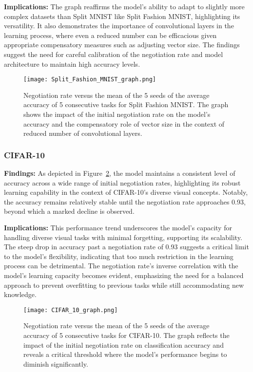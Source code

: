 \documentclass{article}
\begin{document}
\textbf{Implications:} The graph reaffirms the model’s ability to adapt to slightly more complex datasets than Split MNIST like Split Fashion MNIST, highlighting its versatility. It also demonstrates the importance of convolutional layers in the learning process, where even a reduced number can be efficacious given appropriate compensatory measures such as adjusting vector size. The findings suggest the need for careful calibration of the negotiation rate and model architecture to maintain high accuracy levels.

\begin{figure}[htbp]
\centering
\texttt{[image: Split\_Fashion\_MNIST\_graph.png]}
\caption{Negotiation rate versus the mean of the 5 seeds of the average accuracy of 5 consecutive tasks for Split Fashion MNIST. The graph shows the impact of the initial negotiation rate on the model's accuracy and the compensatory role of vector size in the context of reduced number of convolutional layers.}
\label{fig:Split_Fashion_MNIST_graph}
\end{figure}


\subsubsection{CIFAR-10}
\textbf{Findings:} As depicted in Figure~\ref{fig:CIFAR_10_graph}, the model maintains a consistent level of accuracy across a wide range of initial negotiation rates, highlighting its robust learning capability in the context of CIFAR-10's diverse visual concepts. Notably, the accuracy remains relatively stable until the negotiation rate approaches 0.93, beyond which a marked decline is observed.

\textbf{Implications:} This performance trend underscores the model's capacity for handling diverse visual tasks with minimal forgetting, supporting its scalability. The steep drop in accuracy past a negotiation rate of 0.93 suggests a critical limit to the model's flexibility, indicating that too much restriction in the learning process can be detrimental. The negotiation rate's inverse correlation with the model's learning capacity becomes evident, emphasizing the need for a balanced approach to prevent overfitting to previous tasks while still accommodating new knowledge.

\begin{figure}[htbp]
\centering
\texttt{[image: CIFAR\_10\_graph.png]}
\caption{Negotiation rate versus the mean of the 5 seeds of the average accuracy of 5 consecutive tasks for CIFAR-10. The graph reflects the impact of the initial negotiation rate on classification accuracy and reveals a critical threshold where the model's performance begins to diminish significantly.}
\label{fig:CIFAR_10_graph}
\end{figure}
\end{document}
